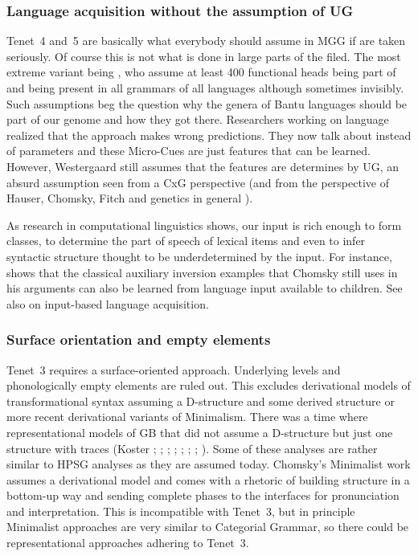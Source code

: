 \documentclass[output=paper]{langsci/langscibook}
\begin{document}
\subsubsection{Language acquisition without the assumption of UG}

Tenet~4 and~5 are basically what everybody should assume in MGG if \citet*{HCF2002a} are taken seriously. Of
course this is not what is done in large parts of the filed. The most extreme variant being
\citet{CR2010a}, who assume at least 400 functional heads being part of  and being present in all grammars of all languages although sometimes
invisibly. Such assumptions beg the question why the genera of Bantu languages should be part of our
genome and how they got there. 
Researchers working on language  realized that the 
approach \citep{Meisel95a} makes wrong predictions. They now talk about  instead of
parameters \citep{Westergaard2014a} and these Micro-Cues are just features that can be
learned. However, Westergaard still assumes that the features are determines by UG, an absurd
assumption seen from a CxG perspective (and from the perspective of Hauser, Chomsky, Fitch and
genetics in general \citep{Bishop2002a}).

As research in computational linguistics shows, our input is rich
enough to form classes, to determine the part of speech of lexical items and even to infer syntactic
structure thought to be underdetermined by the input. For instance, \citet{Bod2009a} shows that the
classical auxiliary inversion examples that Chomsky still uses in his 
arguments can also be learned from language input available to children. See also
\citep{FPG2006a,FPAG2007a} on input-based language acquisition.

\subsubsection{Surface orientation and empty elements}

Tenet~3 requires a surface-oriented approach. Underlying levels and phonologically empty elements
are ruled out. This excludes derivational models of transformational syntax assuming a D-structure
and some derived structure or more recent derivational variants of Minimalism. There was a time
where representational models of GB that did not assume a D-structure but just one structure with
traces (Koster \citeyear[\page ]{Koster78b-u}; \citeyear[]{Koster87a-u}; 
\citealp{KT91a}; \citealp[Section~1.4]{Haider93a}; 
\citealp[]{Frey93a}; \citealp[--88, 177--178]{Lohnstein93a-u}; \citealp[]{FC94a}; \citealp[]{Veenstra98a}). Some of these analyses are rather similar to HPSG
analyses as they are assumed today. Chomsky's Minimalist work \citep{Chomsky95a-u} assumes a derivational model and comes
with a rhetoric of building structure in a bottom-up way and sending complete phases to the
interfaces for pronunciation and interpretation. This is incompatible with Tenet~3, but in principle
Minimalist approaches are very similar to Categorial Grammar, so there could be representational
approaches adhering to Tenet~3.
\end{document}
